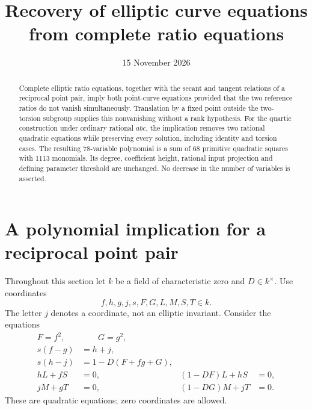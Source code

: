 \documentclass[11pt,a4paper]{article}
\title{Recovery of elliptic curve equations from complete ratio equations}
\author{}\date{15 November 2026}
\theoremstyle{remark}\newtheorem{remark}[theorem]{Remark}
\begin{document}
\maketitle
\begin{abstract}
Complete elliptic ratio equations, together with the secant and tangent
relations of a reciprocal point pair, imply both point-curve equations
provided that the two reference ratios do not vanish simultaneously.
Translation by a fixed point outside the two-torsion subgroup supplies
this nonvanishing without a rank hypothesis. For the quartic construction
under ordinary rational $abc$, the implication removes two rational
quadratic equations while preserving every solution, including identity
and torsion cases. The resulting 78-variable polynomial is a sum of
68 primitive quadratic squares with 1113 monomials. Its degree, coefficient
height, rational input projection and defining parameter threshold are
unchanged. No decrease in the number of variables is asserted.
\end{abstract}

\section{A polynomial implication for a reciprocal point pair}
Throughout this section let $k$ be a field of characteristic zero and
$D\in k^\times$. Use coordinates
\[
 f,h,g,j,s,F,G,L,M,S,T\in k.
\]
The letter $j$ denotes a coordinate, not an elliptic invariant.
Consider the equations
\begin{align}
 F=f^2,&\qquad G=g^2,\label{eq:squares}\\
 s(f-g)&=h+j,\label{eq:secant}\\
 s(h-j)&=1-D(F+fg+G),\label{eq:tangent}\\
 hL+fS&=0, & (1-DF)L+hS&=0,\label{eq:ratio1}\\
 jM+gT&=0, & (1-DG)M+jT&=0.\label{eq:ratio2}
\end{align}
These are quadratic equations; zero coordinates are allowed.
\end{document}
